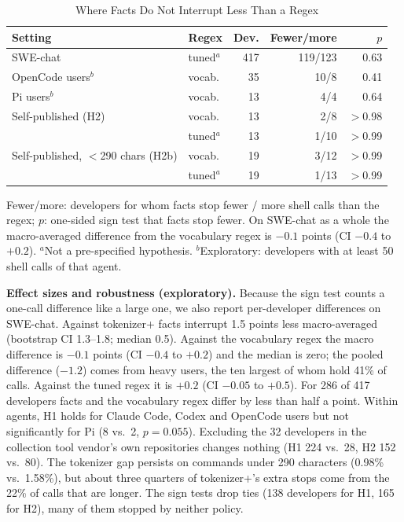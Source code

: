 \documentclass[conference]{IEEEtran}
\begin{document}
\begin{table}[t]
\caption{Where Facts Do Not Interrupt Less Than a Regex}
\label{tab:h2}
\centering\footnotesize
\setlength{\tabcolsep}{3pt}
\begin{tabular}{@{}llrrr@{}}
\toprule
Setting & Regex & Dev. & Fewer/more & $p$ \\
\midrule
SWE-chat & tuned$^a$ & 417 & 119/123 & 0.63 \\
\quad OpenCode users$^b$ & vocab. & 35 & 10/8 & 0.41 \\
\quad Pi users$^b$ & vocab. & 13 & 4/4 & 0.64 \\
Self-published (H2) & vocab. & 13 & 2/8 & $>$0.98 \\
 & tuned$^a$ & 13 & 1/10 & $>$0.99 \\
Self-published, $<$290 chars (H2b) & vocab. & 19 & 3/12 & $>$0.99 \\
 & tuned$^a$ & 19 & 1/13 & $>$0.99 \\
\bottomrule
\end{tabular}\par\vspace{2pt}
\parbox{0.95\columnwidth}{\scriptsize Fewer/more: developers for whom facts stop fewer / more shell calls than the regex; $p$: one-sided sign test that facts stop fewer. On SWE-chat as a whole the macro-averaged difference from the vocabulary regex is $-0.1$ points (CI $-0.4$ to $+0.2$). $^a$Not a pre-specified hypothesis. $^b$Exploratory: developers with at least 50 shell calls of that agent.}
\end{table}

\textbf{Effect sizes and robustness (exploratory).} Because the sign test counts a one-call difference like a large one, we also report per-developer differences on SWE-chat. Against tokenizer+ facts interrupt 1.5 points less macro-averaged (bootstrap CI 1.3--1.8; median 0.5). Against the vocabulary regex the macro difference is $-0.1$ points (CI $-0.4$ to $+0.2$) and the median is zero; the pooled difference ($-1.2$) comes from heavy users, the ten largest of whom hold 41\% of calls. Against the tuned regex it is $+0.2$ (CI $-0.05$ to $+0.5$). For 286 of 417 developers facts and the vocabulary regex differ by less than half a point. Within agents, H1 holds for Claude Code, Codex and OpenCode users but not significantly for Pi (8 vs.\ 2, $p=0.055$). Excluding the 32 developers in the collection tool vendor's own repositories changes nothing (H1 224 vs.\ 28, H2 152 vs.\ 80). The tokenizer gap persists on commands under 290 characters (0.98\% vs.\ 1.58\%), but about three quarters of tokenizer+'s extra stops come from the 22\% of calls that are longer. The sign tests drop ties (138 developers for H1, 165 for H2), many of them stopped by neither policy.
\end{document}
